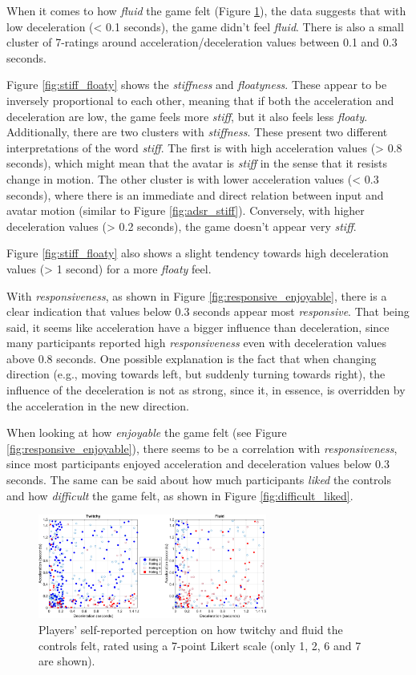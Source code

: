 When it comes to how \textit{fluid} the game felt (Figure \ref{fig:twitchyFluid}), the data suggests that with low deceleration (< 0.1 seconds), the game didn't feel \textit{fluid}. There is also a small cluster of 7-ratings around acceleration/deceleration values between 0.1 and 0.3 seconds.

Figure \ref{fig:stiff_floaty} shows the \textit{stiffness} and \textit{floatyness}. These appear to be inversely proportional to each other, meaning that if both the acceleration and deceleration are low, the game feels more \textit{stiff}, but it also feels less \textit{floaty}. Additionally, there are two clusters with \textit{stiffness}. These present two different interpretations of the word \textit{stiff}. The first is with high acceleration values (> 0.8 seconds), which might mean that the avatar is \textit{stiff} in the sense that it resists change in motion. The other cluster is with lower acceleration values (< 0.3 seconds), where there is an immediate and direct relation between input and avatar motion (similar to Figure \ref{fig:adsr_stiff}). Conversely, with higher deceleration values (> 0.2 seconds), the game doesn't appear very \textit{stiff}.

Figure \ref{fig:stiff_floaty} also shows a slight tendency towards high deceleration values (> 1 second) for a more \textit{floaty} feel.

With \textit{responsiveness}, as shown in Figure \ref{fig:responsive_enjoyable}, there is a clear indication that values below 0.3 seconds appear most \textit{responsive}. That being said, it seems like acceleration have a bigger influence than deceleration, since many participants reported high \textit{responsiveness} even with deceleration values above 0.8 seconds. One possible explanation is the fact that when changing direction (e.g., moving towards left, but suddenly turning towards right), the influence of the deceleration is not as strong, since it, in essence, is overridden by the acceleration in the new direction.

When looking at how \textit{enjoyable} the game felt (see Figure \ref{fig:responsive_enjoyable}), there seems to be a correlation with \textit{responsiveness}, since most participants enjoyed acceleration and deceleration values below 0.3 seconds. The same can be said about how much participants \textit{liked} the controls and how \textit{difficult} the game felt, as shown in Figure \ref{fig:difficult_liked}.

\begin{figure}[htbp]
\centering
\includegraphics[width=0.67\textwidth]{Pics/Classes/twitchy_fluid}
\caption{Players' self-reported perception on how twitchy and fluid the controls felt, rated using a 7-point Likert scale (only 1, 2, 6 and 7 are shown).}
\label{fig:twitchyFluid}
\end{figure}

